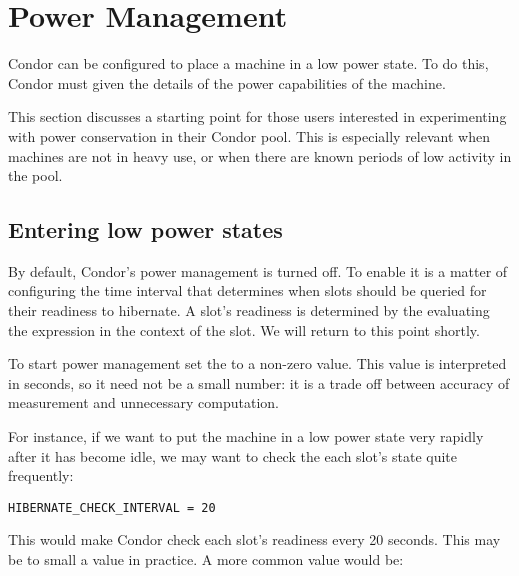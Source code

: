 \section{\label{sec:power-man}Power Management}



Condor can be configured to place a machine in a low power state.  
To do this, Condor must given the details of the power capabilities 
of the machine. 

This section discusses a starting point for those users interested in 
experimenting with power conservation in their Condor pool.  This is 
especially relevant when machines are not in heavy use, or when there 
are known periods of low activity in the pool.

\subsection{Entering low power states}

By default, Condor's power management is turned off.  To enable it is a matter
of configuring the time interval that determines when slots should be queried
for their readiness to hibernate.  A slot's readiness is determined by the 
evaluating the  expression in the context of the slot.  We 
will return to this point shortly.

To start power management set the  to a
non-zero value.  This value is interpreted in seconds, so it need not 
be a small number: it is a trade off between accuracy of measurement and 
unnecessary computation.  

For instance, if we want to put the machine in a low power state very rapidly
after it has become idle, we may want to check the each slot's state quite
frequently:

\begin{verbatim}
HIBERNATE_CHECK_INTERVAL = 20
\end{verbatim}

This would make Condor check each slot's readiness every 20 seconds.  This
may be to small a value in practice. A more common value would be:

